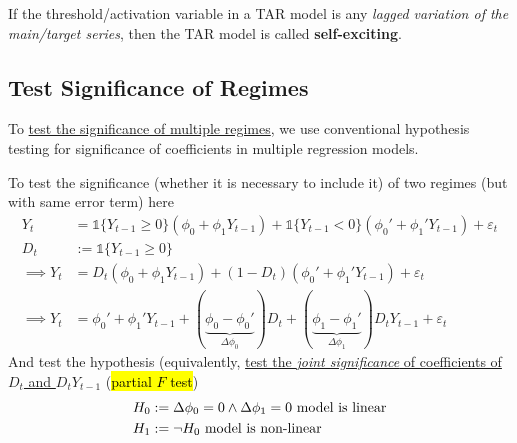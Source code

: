 \documentclass[11pt]{article}
\begin{document}
			\begin{definition}
				If the threshold/activation variable in a TAR model is any \emph{lagged variation of the main/target series}, then the TAR model is called \textbf{self-exciting}.
			\end{definition}
		
		\subsection{Test Significance of Regimes}
			\begin{remark}
				To \ul{test the significance of multiple regimes}, we use conventional hypothesis testing for significance of coefficients in multiple regression models.
			\end{remark}
			\begin{example}
				To test the significance (whether it is necessary to include it) of two regimes (but with same error term) here 
				\begin{align}
					Y_t &= \mathds{1}\{ Y_{t-1} \geq 0\} 
					\left ( 
						\phi_0 + \phi_1 Y_{t-1}
					\right )
					+ 
					\mathds{1}\{ Y_{t-1} < 0\} 
					\left ( 
						\phi_0' + \phi_1' Y_{t-1}
					\right ) + \varepsilon_t \\
					D_t &:= \mathds{1}\{ Y_{t-1} \geq 0\} \\
					\implies Y_t &= D_t \left (\phi_0 + \phi_1 Y_{t-1}\right ) + (1 - D_t) \left (\phi_0' + \phi_1' Y_{t-1}\right ) + \varepsilon_t \\
					\implies Y_t &= \phi_0' + \phi_1' Y_{t-1} + (\underbrace{\phi_0 - \phi_0'}_{\Delta \phi_0}) D_t + (\underbrace{\phi_1 - \phi_1'}_{\Delta \phi_1}) D_t Y_{t-1} + \varepsilon_t
				\end{align}
				And test the hypothesis (equivalently, \ul{test the \emph{joint significance} of coefficients of $D_t$ and $D_t Y_{t-1}$} (\hl{partial $F$ test})
				\begin{align}
					H_0 &:= \Delta \phi_0 = 0 \land \Delta \phi_1 = 0 \text{{ model is linear}}\\
					H_1 &:= \neg H_0 \text{{ model is non-linear}}
				\end{align}
			\end{example}
			
\end{document}

